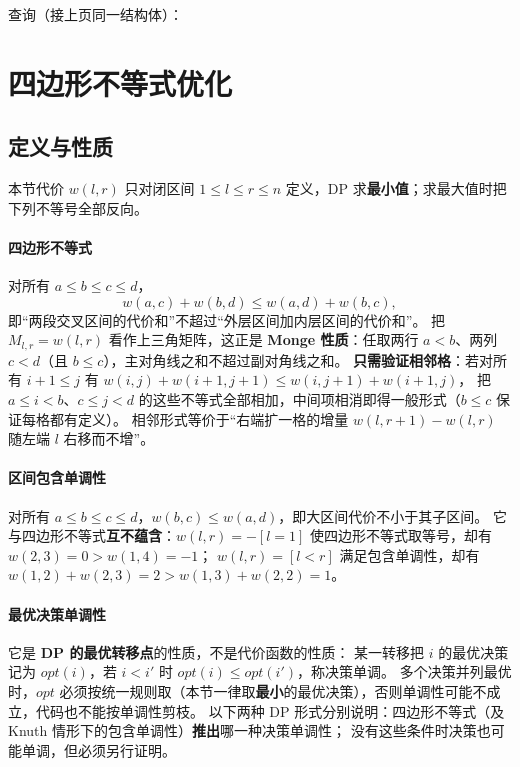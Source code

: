 \Needspace{545pt}



\newpage

\noindent 查询（接上页同一结构体）：



\newpage

\section{四边形不等式优化}

\subsection{定义与性质}\label{knowledge-quadrangle-definitions}
本节代价 $w(l,r)$ 只对闭区间 $1\le l\le r\le n$ 定义，DP 求\textbf{最小值}；求最大值时把下列不等号全部反向。

\paragraph{四边形不等式} 对所有 $a\le b\le c\le d$，
\[
 w(a,c)+w(b,d)\le w(a,d)+w(b,c),
\]
即“两段交叉区间的代价和”不超过“外层区间加内层区间的代价和”。
把 $M_{l,r}=w(l,r)$ 看作上三角矩阵，这正是 \textbf{Monge 性质}：任取两行 $a<b$、两列 $c<d$（且 $b\le c$），主对角线之和不超过副对角线之和。
\textbf{只需验证相邻格}：若对所有 $i+1\le j$ 有 $w(i,j)+w(i+1,j+1)\le w(i,j+1)+w(i+1,j)$，
把 $a\le i<b$、$c\le j<d$ 的这些不等式全部相加，中间项相消即得一般形式（$b\le c$ 保证每格都有定义）。
相邻形式等价于“右端扩一格的增量 $w(l,r+1)-w(l,r)$ 随左端 $l$ 右移而不增”。

\paragraph{区间包含单调性} 对所有 $a\le b\le c\le d$，$w(b,c)\le w(a,d)$，即大区间代价不小于其子区间。
它与四边形不等式\textbf{互不蕴含}：$w(l,r)=-[l=1]$ 使四边形不等式取等号，却有 $w(2,3)=0>w(1,4)=-1$；
$w(l,r)=[l<r]$ 满足包含单调性，却有 $w(1,2)+w(2,3)=2>w(1,3)+w(2,2)=1$。

\paragraph{最优决策单调性} 它是 \textbf{DP 的最优转移点}的性质，不是代价函数的性质：
某一转移把 $i$ 的最优决策记为 $opt(i)$，若 $i<i'$ 时 $opt(i)\le opt(i')$，称决策单调。
多个决策并列最优时，$opt$ 必须按统一规则取（本节一律取\textbf{最小}的最优决策），否则单调性可能不成立，代码也不能按单调性剪枝。
以下两种 DP 形式分别说明：四边形不等式（及 Knuth 情形下的包含单调性）\textbf{推出}哪一种决策单调性；
没有这些条件时决策也可能单调，但必须另行证明。

